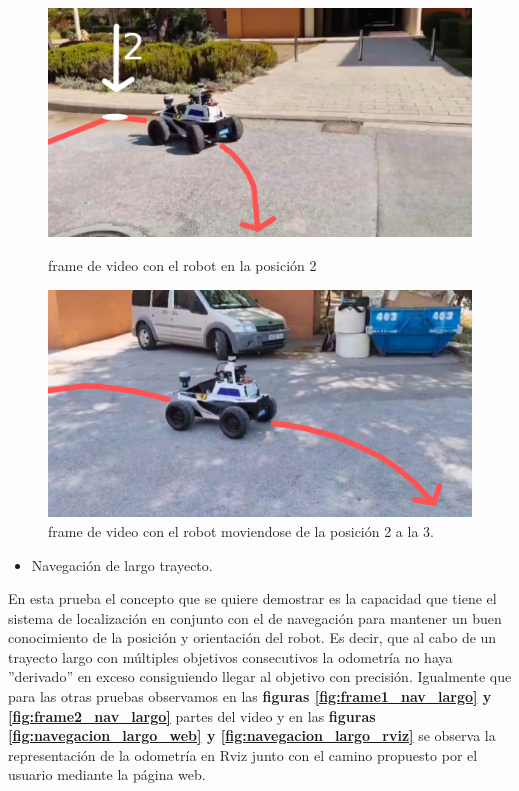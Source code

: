 \begin{figure}[htbp]
  \centering
  \begin{minipage}[b]{0.45\textwidth}
    \centering
    \includegraphics[width=\textwidth]{images/triangulo_punto_2_nav_video.png}
    \caption{frame de video con el robot en la posición 2}
    \label{fig:frame1_nav_compleja}
  \end{minipage}
  \hfill
  \begin{minipage}[b]{0.45\textwidth}
    \centering
    \includegraphics[width=\textwidth]{images/triangulo_punto_3_nav.jpeg}
    \caption{frame de video con el robot moviendose de la posición 2 a la 3.}
    \label{fig:frame2_nav_compleja}
  \end{minipage}
\end{figure}

\newpage
\begin{itemize}
  \item Navegación de largo trayecto.
\end{itemize}
En esta prueba el concepto que se quiere demostrar es la capacidad que tiene el sistema de localización en conjunto con el de navegación para mantener un 
buen conocimiento de la posición y orientación del robot. Es decir, que al cabo de un trayecto largo con múltiples objetivos consecutivos la odometría no haya ''derivado'' en 
exceso consiguiendo llegar al objetivo con precisión.
Igualmente que para las otras pruebas observamos en las \textbf{figuras \ref{fig:frame1_nav_largo} y \ref{fig:frame2_nav_largo}} partes del video y en las \textbf{figuras \ref{fig:navegacion_largo_web} y \ref{fig:navegacion_largo_rviz}} se observa 
la representación de la odometría en Rviz junto con el camino propuesto por el usuario mediante la página web.

